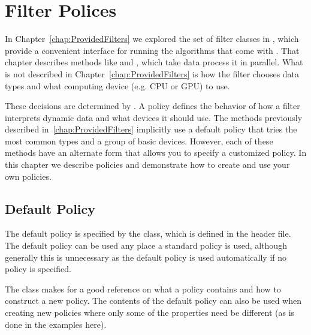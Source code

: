 
\chapter{Filter Polices}
\label{chap:FilterPolicies}
\label{chap:Policies}


In Chapter~\ref{chap:ProvidedFilters} we explored the set of filter classes in \VTKm, which provide a convenient interface for running the algorithms that come with \VTKm.
That chapter describes methods like  and , which take data process it in parallel.
What is not described in Chapter~\ref{chap:ProvidedFilters} is how the filter chooses data types and what computing device (e.g. CPU or GPU) to use.

These decisions are determined by .
A policy defines the behavior of how a filter interprets dynamic data and what devices it should use.
The methods previously described in~\ref{chap:ProvidedFilters} implicitly use a default policy that tries the most common types and a group of basic devices.
However, each of these methods have an alternate form that allows you to specify a customized policy.
In this chapter we describe policies and demonstrate how to create and use your own policies.


\section{Default Policy}


The default policy is specified by the  class, which is defined in the  header file.
The default policy can be used any place a standard policy is used, although generally this is unnecessary as the default policy is used automatically if no policy is specified.

\begin{didyouknow}
  The  class makes for a good reference on what a policy contains and how to construct a new policy.
  The contents of the default policy can also be used when creating new policies where only some of the properties need be different (as is done in the examples here).
\end{didyouknow}

